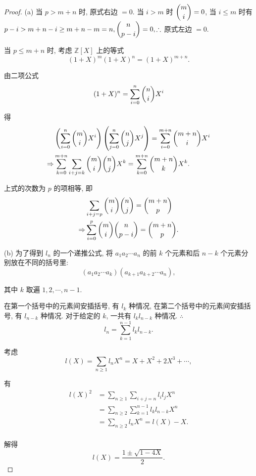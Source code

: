 \documentclass[color=black,device=normal,lang=cn,mode=geye]{elegantnote}
\begin{document}
\begin{proof}
    (a) 当 $p>m+n$ 时, 原式右边 $=0$. 当 $i>m$ 时 $\dbinom{m}{i}=0$, 当 $i\leq m$ 时有 $p-i>m+n-i\geq m+n-m=n,\dbinom{n}{p-i}=0,\therefore$ 原式左边 $=0$.

    当 $p\leq m+n$ 时, 考虑 $\mathbb{Z}[X]$ 上的等式
    \[(1+X)^m(1+X)^n=(1+X)^{m+n}.\]

    由二项公式
    \[(1+X)^n=\sum\limits_{i=0}^n\dbinom{n}{i}X^i\]

    得
    \begin{align*}
        & \left(\sum\limits_{i=0}^n\dbinom{m}{i}X^i\right)\left(\sum\limits_{j=0}^n\dbinom{n}{j}X^j\right)=\sum\limits_{i=0}^{m+n}\dbinom{m+n}{i}X^i \\
        \Rightarrow & \sum\limits_{k=0}^{m+n}\sum\limits_{i+j=k}\dbinom{m}{i}\dbinom{n}{j}X^k=\sum\limits_{k=0}^{m+n}\dbinom{m+n}{k}X^k. \\
    \end{align*}

    上式的次数为 $p$ 的项相等, 即
    \begin{align*}
        & \sum\limits_{i+j=p}\dbinom{m}{i}\dbinom{n}{j}=\dbinom{m+n}{p} \\
        \Rightarrow & \sum\limits_{i=0}^p\dbinom{m}{i}\dbinom{n}{p-i}=\dbinom{m+n}{p}. \\
    \end{align*}

    (b) 为了得到 $l_n$ 的一个递推公式, 将 $a_1a_2\cdots a_n$ 的前 $k$ 个元素和后 $n-k$ 个元素分别放在不同的括号里:
    \[(a_1a_2\cdots a_k)(a_{k+1}a_{k+2}\cdots a_n),\]

    其中 $k$ 取遍 $1,2,\cdots,n-1$.

    在第一个括号中的元素间安插括号, 有 $l_k$ 种情况, 在第二个括号中的元素间安插括号, 有 $l_{n-k}$ 种情况. 对于给定的 $k$, 一共有 $l_kl_{n-k}$ 种情况. $\therefore$
    \[l_n=\sum\limits_{k=1}^{n-1}l_kl_{n-k}.\]

    考虑
    \[l(X)=\sum\limits_{n\geq1}l_nX^n=X+X^2+2X^3+\cdots,\]

    有
    \begin{align*}
        l(X)^2 & =\sum\limits_{n\geq1}\sum\limits_{i+j=n}l_il_jX^n \\
        & =\sum\limits_{n\geq2}\sum\limits_{k=1}^{n-1}l_kl_{n-k}X^n \\
        & =\sum\limits_{n\geq2}l_nX^n=l(X)-X. \\
    \end{align*}

    解得
    \[l(X)=\dfrac{1\pm\sqrt{1-4X}}{2}.\]


\end{proof}
\end{document}
